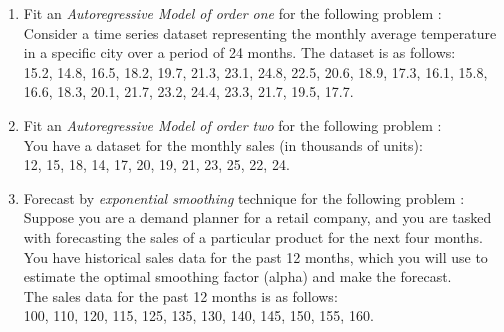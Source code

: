 \documentclass[11pt, a4paper]{article}
\begin{document}
\begin{enumerate}
	
	
	
	
	
	
	
	
	
	
	
	\item Fit an \textit{Autoregressive Model of order one} for the following problem : \\
	
	Consider a time series dataset representing the monthly average temperature in a specific city over a period of 24 months. The dataset is as follows: \\
	
	15.2, 14.8, 16.5, 18.2, 19.7, 21.3, 23.1, 24.8, 22.5, 20.6, 18.9, 17.3, 16.1, 15.8, 16.6, 18.3, 20.1, 21.7, 23.2, 24.4, 23.3, 21.7, 19.5, 17.7.
	
	
	
	
	
	
	
	
	
	
	
	
	\item Fit an \textit{Autoregressive Model of order two} for the following problem : \\
	
	You have a dataset for the monthly sales (in thousands of units): \\
	
	12, 15, 18, 14, 17, 20, 19, 21, 23, 25, 22, 24.
	
	
	
	
	
	
	
	
	
	
	
	
	
	
	
	\item Forecast by \textit{exponential smoothing} technique for the following problem : \\
	
	Suppose you are a demand planner for a retail company, and you are tasked with forecasting the sales of a particular product for the next four months. You have historical sales data for the past 12 months, which you will use to estimate the optimal smoothing factor (alpha) and make the forecast. \\
	
	The sales data for the past 12 months is as follows: \\
	
	100, 110, 120, 115, 125, 135, 130, 140, 145, 150, 155, 160.
	

\end{enumerate}
\end{document}
